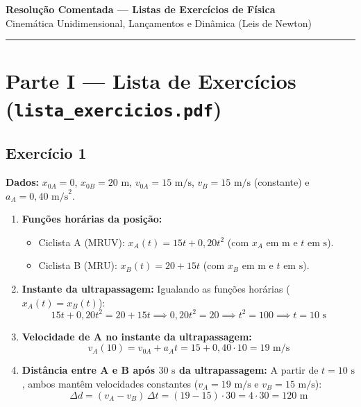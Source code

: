 \documentclass[11pt, a4paper]{article}
\begin{document}
\begin{center}
    {\Large \textbf{\color{primary} Resolução Comentada --- Listas de Exercícios de Física}} \\[4pt]
    {\small \color{muted} Cinemática Unidimensional, Lançamentos e Dinâmica (Leis de Newton)}
\end{center}

\vspace{4pt}
\hrule
\vspace{8pt}

\section*{\color{primary} Parte I --- Lista de Exercícios (\texttt{lista\_exercicios.pdf})}

\subsection*{Exercício 1}
\textbf{Dados:} $x_{0A} = 0$, $x_{0B} = 20\text{ m}$, $v_{0A} = 15\text{ m/s}$, $v_B = 15\text{ m/s}$ (constante) e $a_A = 0{,}40\text{ m/s}^2$.

\begin{enumerate}[label=\textbf{(\alph*)}]
    \item \textbf{Funções horárias da posição:}
    \begin{itemize}
        \item Ciclista A (MRUV): $x_A(t) = 15t + 0{,}20t^2$ (com $x_A$ em $\text{m}$ e $t$ em $\text{s}$).
        \item Ciclista B (MRU): $x_B(t) = 20 + 15t$ (com $x_B$ em $\text{m}$ e $t$ em $\text{s}$).
    \end{itemize}

    \item \textbf{Instante da ultrapassagem:}
    Igualando as funções horárias ($x_A(t) = x_B(t)$):
    \[
        15t + 0{,}20t^2 = 20 + 15t \implies 0{,}20t^2 = 20 \implies t^2 = 100 \implies t = 10\text{ s}
    \]

    \item \textbf{Velocidade de A no instante da ultrapassagem:}
    \[
        v_A(10) = v_{0A} + a_A t = 15 + 0{,}40 \cdot 10 = 19\text{ m/s}
    \]

    \item \textbf{Distância entre A e B após $30\text{ s}$ da ultrapassagem:}
    A partir de $t = 10\text{ s}$, ambos mantêm velocidades constantes ($v_A = 19\text{ m/s}$ e $v_B = 15\text{ m/s}$):
    \[
        \Delta d = (v_A - v_B)\,\Delta t = (19 - 15) \cdot 30 = 4 \cdot 30 = 120\text{ m}
    \]
\end{enumerate}
\end{document}
